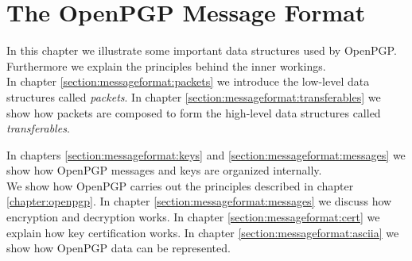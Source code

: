 \chapter{The OpenPGP Message Format} \label{chapter:messageformat}









In this chapter we illustrate some important data structures used by OpenPGP. Furthermore we explain the principles behind the inner workings. \\

In chapter \ref{section:messageformat:packets} we introduce the low-level data structures called \textit{packets}. In chapter \ref{section:messageformat:transferables} we show how packets are composed to form the high-level data structures called \textit{transferables}.

In chapters \ref{section:messageformat:keys} and \ref{section:messageformat:messages} we show how OpenPGP messages and keys are organized internally. \\

We show how OpenPGP carries out the principles described in chapter \ref{chapter:openpgp}.
In chapter \ref{section:messageformat:messages} we discuss how encryption and decryption works. In chapter \ref{section:messageformat:cert} we explain how key certification works. In chapter \ref{section:messageformat:asciia} we show how OpenPGP data can be represented.


